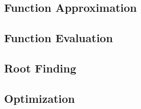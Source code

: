 


\subsection{Function Approximation}

\subsection{Function Evaluation}

\subsection{Root Finding}


\subsection{Optimization}




\begin{comment}

\end{comment}